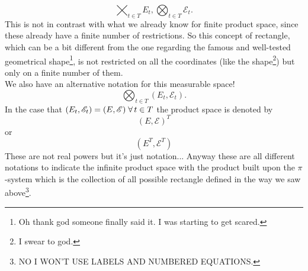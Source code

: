 \documentclass{report}
\begin{document}
\[\bigtimes_{t\in T}E_t,\bigotimes_{t\in T}\mathscr{E}_t.\] This is not in contrast with what we already know for finite product space, since these already have a finite number of restrictions. So this concept of rectangle, which can be a bit different from the one regarding the famous and well-tested geometrical shape\footnote{Oh thank god someone finally said it. I was starting to get scared.}, is not restricted on all the coordinates (like the shape\footnote{I swear to god.}) but only on a finite number of them. \\
We also have an alternative notation for this measurable space!
\[\bigotimes_{t\in T}(E_t,\mathscr{E}_t).\]
In the case that $(E_t,\mathscr{E}_t)=(E,\mathscr{E})\;\forall\, t\in T$ the product space is denoted by
\[(E,\mathscr{E})^T\] or 
\[(E^T,\mathscr{E}^T)\]
These are not real powers but it's just notation... Anyway these are all different notations to indicate the infinite product space with the product \sa{} built upon the $\pi$-system which is the collection of all possible rectangle defined in the way we saw above\footnote{NO I WON'T USE LABELS AND NUMBERED EQUATIONS.}.
\end{document}
